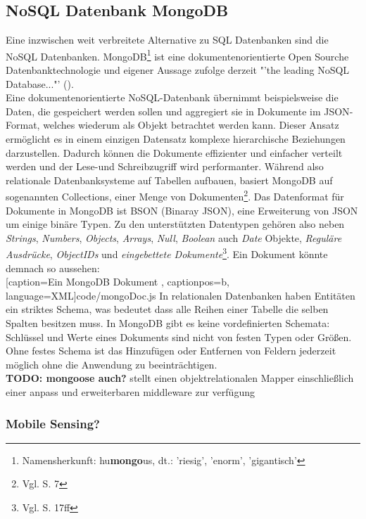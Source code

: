 \subsection{NoSQL Datenbank MongoDB}
Eine inzwischen weit verbreitete Alternative zu \gls{SQL} Datenbanken sind die \gls{NoSQL} Datenbanken. MongoDB\footnote{ Namensherkunft: hu\textbf{mongo}us, dt.: 'riesig', 'enorm', 'gigantisch'} ist eine dokumentenorientierte Open Sourche Datenbanktechnologie und eigener Aussage zufolge derzeit "'the leading NoSQL Database..."' (\cite{mongodb}). \\
Eine dokumentenorientierte \gls{NoSQL}-Datenbank übernimmt beispielsweise die Daten, die gespeichert werden sollen und aggregiert sie in Dokumente im \gls{JSON}-Format, welches wiederum als Objekt betrachtet werden kann. Dieser Ansatz ermöglicht es in einem einzigen Datensatz komplexe hierarchische Beziehungen darzustellen. Dadurch können die Dokumente effizienter und einfacher verteilt werden und der Lese-und Schreibzugriff wird performanter. Während also relationale Datenbanksysteme auf Tabellen aufbauen, basiert MongoDB auf sogenannten Collections, einer Menge von Dokumenten\footnote{ Vgl. \cite{mongoDef} S. 7}. Das Datenformat für Dokumente in MongoDB ist BSON (Binaray JSON), eine Erweiterung von \gls{JSON} um einige binäre Typen. Zu den unterstützten Datentypen gehören also neben \textit{Strings}, \textit{Numbers}, \textit{Objects}, \textit{Arrays}, \textit{Null}, \textit{Boolean} auch \textit{Date} Objekte, \textit{Reguläre Ausdrücke}, \textit{ObjectIDs} und \textit{eingebettete Dokumente}\footnote{ Vgl. \cite{mongoDef} S. 17ff}. Ein Dokument könnte demnach so aussehen: \\

	[caption={Ein MongoDB Dokument}
	\label{code:mongo}, captionpos=b, language=XML]{code/mongoDoc.js}
In relationalen Datenbanken haben Entitäten ein striktes Schema, was bedeutet dass alle Reihen einer Tabelle die selben Spalten besitzen muss. In MongoDB gibt es keine vordefinierten Schemata: Schlüssel und Werte eines Dokuments sind nicht von festen Typen oder Größen. Ohne festes Schema ist das Hinzufügen oder Entfernen von Feldern jederzeit möglich ohne die Anwendung zu beeinträchtigen.\\
\textbf{\large TODO: mongoose auch?}
stellt einen objektrelationalen Mapper einschließlich einer anpass und erweiterbaren middleware zur verfügung
\subsubsection*{Mobile Sensing?}
